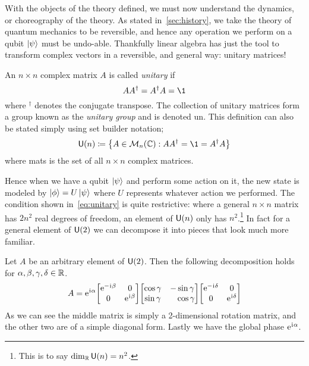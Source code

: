 With the objects of the theory defined, we must now understand the dynamics, or choreography of the theory.
As stated in~\cref{sec:history}, we take the theory of quantum mechanics to be reversible, and hence any operation we perform on a qubit $\ket{\psi}$ must be undo-able.
Thankfully linear algebra has just the tool to transform complex vectors in a reversible, and general way: unitary matrices!
\begin{definition}
    An $n\times n$ complex matrix $A$ is called \emph{unitary} if
    \begin{equation}\label{eq:unitary}
        AA^\dagger = A^\dagger A = \1
    \end{equation}
    where $^\dagger$ denotes the conjugate transpose.
    The collection of unitary matrices form a group known as the \emph{unitary group} and is denoted \gls{un}.
    This definition can also be stated simply using set builder notation;
    \begin{equation}
        \U{n} \defeq \qty{ A \in \mats{n}{\C} : AA^\dagger = \1 = A^\dagger A }
    \end{equation}
    where \gls{mats} is the set of all $n \times n$ complex matrices.
\end{definition}
Hence when we have a qubit $\ket{\psi}$ and perform some action on it, the new state is modeled by $\ket{\phi} = U\ket{\psi}$ where $U$ represents whatever action we performed.
The condition shown in~\cref{eq:unitary} is quite restrictive: where a general $n \times n$ matrix has $2n^2$ real degrees of freedom, an element of $\mathsf{U} (n)$ only has $n^2$.\footnote{This is to say $\dim_{\mathbb{R}}\mathsf{U} (n) = n^2$.}
In fact for a general element of $\mathsf{U} (2)$ we can decompose it into pieces that look much more familiar. %
\begin{example}\label{ex:u2decomp}
    Let $A$ be an arbitrary element of $\mathsf{U} (2)$.
    Then the following decomposition holds for $\alpha, \beta, \gamma, \delta \in \mathbb{R}$.
    \begin{equation}
        A = \e^{\iu\alpha}\mqty[\dmat[0]{\e^{-\iu \beta}, \e^{\iu \beta}}]\mqty[\cos\gamma & -\sin\gamma \\ \sin\gamma & \phantom{+}\cos\gamma]\mqty[\dmat[0]{\e^{-\iu \delta}, \e^{\iu \delta}}]
    \end{equation}
    As we can see the middle matrix is simply a 2-dimensional rotation matrix, and the other two are of a simple diagonal form.
    Lastly we have the global phase $\mathrm{e}^{\mkern1mu\mathrm{i}\mkern1mu \alpha}$.
\end{example}

